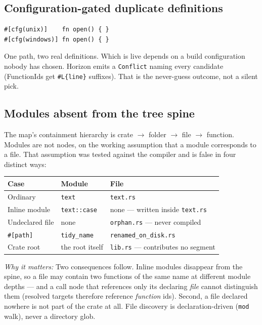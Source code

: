 \documentclass[11pt,a4paper]{article}
\newcommand{\note}{\par\smallskip\noindent\textit{Why it matters:} }
\begin{document}
\subsection{Configuration-gated duplicate definitions}

\begin{lstlisting}
#[cfg(unix)]    fn open() { }
#[cfg(windows)] fn open() { }
\end{lstlisting}

One path, two real definitions. Which is live depends on a build configuration
nobody has chosen. Horizon emits a \verb|Conflict| naming every candidate
(FunctionIds get \verb|#L{line}| suffixes). That is the never-guess outcome,
not a silent pick.

\subsection{Modules absent from the tree spine}

The map's containment hierarchy is crate $\rightarrow$ folder $\rightarrow$
file $\rightarrow$ function. Modules are not nodes, on the working assumption
that a module corresponds to a file. That assumption was tested against the
compiler and is false in four distinct ways:

\begin{table}[h]
\centering
\begin{tabular}{@{}lll@{}}
\toprule
\textbf{Case} & \textbf{Module} & \textbf{File} \\
\midrule
Ordinary            & \verb|text|              & \verb|text.rs| \\
Inline module       & \verb|text::case|        & none --- written inside \verb|text.rs| \\
Undeclared file     & none                     & \verb|orphan.rs| --- never compiled \\
\verb|#[path]|      & \verb|tidy_name|         & \verb|renamed_on_disk.rs| \\
Crate root          & the root itself          & \verb|lib.rs| --- contributes no segment \\
\bottomrule
\end{tabular}
\end{table}

\note{Two consequences follow. Inline modules disappear from the spine, so a file
may contain two functions of the same name at different module depths --- and a
call node that references only its declaring \emph{file} cannot distinguish them
(resolved targets therefore reference \emph{function} ids). Second, a file
declared nowhere is not part of the crate at all. File discovery is
declaration-driven (\verb|mod| walk), never a directory glob.}
\end{document}
